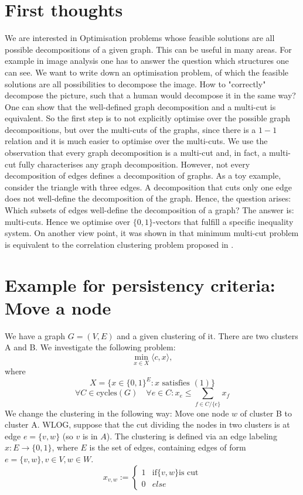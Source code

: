 \section{First thoughts}
We are interested in Optimisation problems whose feasible solutions are all possible decompositions of a given graph. This can be useful in many areas. For example in image analysis one has to answer the question which structures one can see. We want to write down an optimisation problem, of which the feasible solutions are all possibilities to decompose the image. How to "correctly" decompose the picture, such that a human would decompose it in the same way? One can show that the well-defined graph decomposition and a multi-cut is equivalent. So the first step is to not explicitly optimise over the possible graph decompositions, but over the multi-cuts of the graphs, since there is a $1 - 1$ relation and it is much easier to optimise over the multi-cuts.  We use the observation that every graph decomposition is a multi-cut and, in fact, a multi-cut fully characterises any graph decomposition. However, not every decomposition of edges defines a decomposition of graphs. As a toy example, consider the triangle with three edges. A decomposition that cuts only one edge does not well-define the decomposition of the graph. Hence, the question arises: Which subsets of edges well-define the decomposition of a graph? The answer is: multi-cuts. Hence we optimise over $\{0,1\}$-vectors that fulfill a specific inequality system. On another view point, it was shown in \cite{Demaine} that minimum multi-cut problem is equivalent to the correlation clustering problem proposed in \cite{Bansal}. 




\section{Example for persistency criteria: Move a node}

We have a graph $G=(V,E)$ and a given clustering of it. There are two clusters A and B. We investigate the following problem: 
\[ \min_{x \in X} \langle c,x \rangle,  \] where 
\[ X = \{ x \in \{0,1\}^E: x \text{ satisfies } (1) \} \] 
\begin{equation}
\forall C \in \text{cycles}(G) \quad \forall e \in C: x_e \leq \sum_{f \in C / \{e\} } x_f
\end{equation}
We change the clustering in the following way: Move one node $w$ of cluster B to cluster A. WLOG, suppose that the cut dividing the nodes in two clusters is at edge $e=\{v,w\}$ (so $v$ is in $A$).
The clustering is defined via an edge labeling $x: E \rightarrow \{0,1\}$, where $E$ is the set of edges, containing edges of form $e=\{v,w\}, v \in V, w \in W$. 
\[ x_{v,w}:=  \begin{cases}
1 & \text{if} \{v,w\} \text{is cut} \\
0 & else \end{cases} \] 


